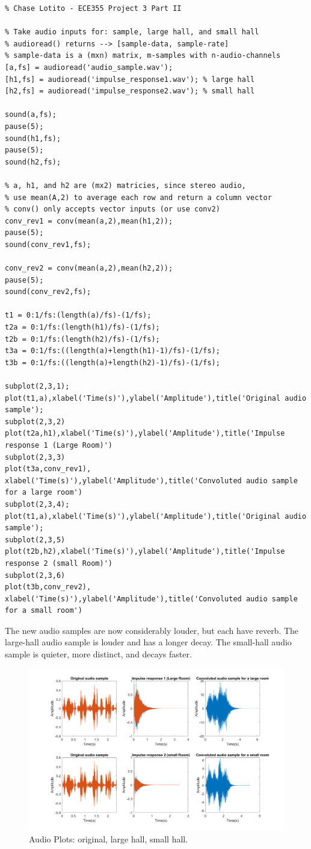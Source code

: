 \documentclass{article}
\begin{document}
\begin{lstlisting}
% Chase Lotito - ECE355 Project 3 Part II

% Take audio inputs for: sample, large hall, and small hall
% audioread() returns --> [sample-data, sample-rate]
% sample-data is a (mxn) matrix, m-samples with n-audio-channels
[a,fs] = audioread('audio_sample.wav');
[h1,fs] = audioread('impulse_response1.wav'); % large hall
[h2,fs] = audioread('impulse_response2.wav'); % small hall

sound(a,fs);
pause(5);
sound(h1,fs);
pause(5);
sound(h2,fs);

% a, h1, and h2 are (mx2) matricies, since stereo audio,
% use mean(A,2) to average each row and return a column vector
% conv() only accepts vector inputs (or use conv2)
conv_rev1 = conv(mean(a,2),mean(h1,2));
pause(5);
sound(conv_rev1,fs);

conv_rev2 = conv(mean(a,2),mean(h2,2));
pause(5);
sound(conv_rev2,fs);

t1 = 0:1/fs:(length(a)/fs)-(1/fs);
t2a = 0:1/fs:(length(h1)/fs)-(1/fs);
t2b = 0:1/fs:(length(h2)/fs)-(1/fs);
t3a = 0:1/fs:((length(a)+length(h1)-1)/fs)-(1/fs);
t3b = 0:1/fs:((length(a)+length(h2)-1)/fs)-(1/fs);

subplot(2,3,1);
plot(t1,a),xlabel('Time(s)'),ylabel('Amplitude'),title('Original audio sample');
subplot(2,3,2)
plot(t2a,h1),xlabel('Time(s)'),ylabel('Amplitude'),title('Impulse response 1 (Large Room)')
subplot(2,3,3)
plot(t3a,conv_rev1), xlabel('Time(s)'),ylabel('Amplitude'),title('Convoluted audio sample for a large room')
subplot(2,3,4);
plot(t1,a),xlabel('Time(s)'),ylabel('Amplitude'),title('Original audio sample');
subplot(2,3,5)
plot(t2b,h2),xlabel('Time(s)'),ylabel('Amplitude'),title('Impulse response 2 (small Room)')
subplot(2,3,6)
plot(t3b,conv_rev2), xlabel('Time(s)'),ylabel('Amplitude'),title('Convoluted audio sample for a small room')
\end{lstlisting}

The new audio samples are now considerably louder, but each have reverb. The large-hall audio sample is louder and has a longer decay. The small-hall audio sample is quieter, more distinct, and decays faster.

\begin{figure}[!ht] 
    \centering
    \includegraphics[width = 15cm]{audio-plot.png}
    \caption{Audio Plots: original, large hall, small hall.}
    \label{fig:audioplot}
\end{figure}
\end{document}
